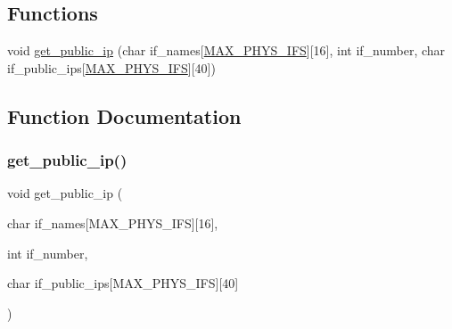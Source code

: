 \subsection*{Functions}
\begin{DoxyCompactItemize}
\item 
void \hyperlink{public-ip_8h_a343631cf6f2ceb1736d8b227c2cf76d3}{get\+\_\+public\+\_\+ip} (char if\+\_\+names\mbox{[}\hyperlink{route-tree_8h_a5f66955385e84e67789d731b5cad24c7}{M\+A\+X\+\_\+\+P\+H\+Y\+S\+\_\+\+I\+FS}\mbox{]}\mbox{[}16\mbox{]}, int if\+\_\+number, char if\+\_\+public\+\_\+ips\mbox{[}\hyperlink{route-tree_8h_a5f66955385e84e67789d731b5cad24c7}{M\+A\+X\+\_\+\+P\+H\+Y\+S\+\_\+\+I\+FS}\mbox{]}\mbox{[}40\mbox{]})
\end{DoxyCompactItemize}


\subsection{Function Documentation}
\mbox{\label{public-ip_8h_a343631cf6f2ceb1736d8b227c2cf76d3}} 
\subsubsection{\texorpdfstring{get\+\_\+public\+\_\+ip()}{get\_public\_ip()}}
{\footnotesize\ttfamily void get\+\_\+public\+\_\+ip (\begin{DoxyParamCaption}\item[{char}]{if\+\_\+names\mbox{[}\+M\+A\+X\+\_\+\+P\+H\+Y\+S\+\_\+\+I\+F\+S\mbox{]}\mbox{[}16\mbox{]},  }\item[{int}]{if\+\_\+number,  }\item[{char}]{if\+\_\+public\+\_\+ips\mbox{[}\+M\+A\+X\+\_\+\+P\+H\+Y\+S\+\_\+\+I\+F\+S\mbox{]}\mbox{[}40\mbox{]} }\end{DoxyParamCaption})}


